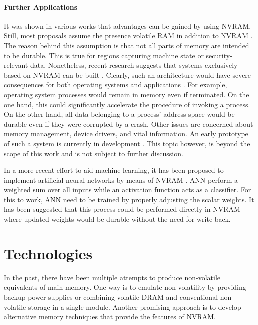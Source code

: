 \paragraph{Further Applications}

It was shown in various works that advantages can be gained by using NVRAM.
Still, most proposals assume the presence volatile RAM in addition to NVRAM
\cite{oukid2017data}. The reason behind this assumption is that not all parts of
memory are intended to be durable. This is true for regions capturing machine
state or security-relevant data. Nonetheless, recent research suggests that
systems exclusively based on NVRAM can be built \cite{narayanan2012whole}.
Clearly, such an architecture would have severe consequences for both operating
systems and applications \cite{bailey2011operating}. For example, operating
system processes would remain in memory even if terminated. On the one hand,
this could significantly accelerate the procedure of invoking a process. On the
other hand, all data belonging to a process' address space would be durable even
if they were corrupted by a crash. Other issues are concerned about memory
management, device drivers, and vital information. An early prototype of such a
system is currently in development \cite{courtland2016can}. This topic however,
is beyond the scope of this work and is not subject to further discussion.

In a more recent effort to aid machine learning, it has been proposed to
implement artificial neural networks by means of NVRAM
\cite{fumarola2016accelerating}. ANN perform a weighted sum over all inputs
while an activation function acts as a classifier. For this to work, ANN need to
be trained by properly adjusting the scalar weights. It has been suggested that
this process could be performed directly in NVRAM where updated weights would be
durable without the need for write-back.

\section{Technologies}

In the past, there have been multiple attempts to produce non-volatile
equivalents of main memory. One way is to emulate non-volatility by providing
backup power supplies or combining volatile DRAM and conventional non-volatile
storage in a single module. Another promising approach is to develop alternative
memory techniques that provide the features of NVRAM.


